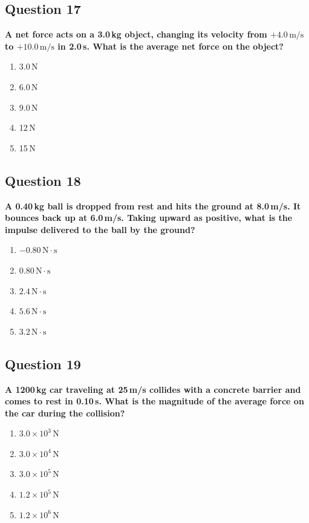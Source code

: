 \documentclass[12pt,letterpaper]{article}
\begin{document}
\subsection{Question 17}

\begin{questionbox}
\textbf{A net force acts on a 3.0\,kg object, changing its velocity from $+4.0\,\text{m/s}$ to $+10.0\,\text{m/s}$ in 2.0\,s. What is the average net force on the object?}

\begin{enumerate}[label=\alph*)]
    \item 3.0\,N
    \item 6.0\,N
    \item 9.0\,N
    \item 12\,N
    \item 15\,N
\end{enumerate}
\end{questionbox}

\subsection{Question 18}

\begin{questionbox}
\textbf{A 0.40\,kg ball is dropped from rest and hits the ground at 8.0\,m/s. It bounces back up at 6.0\,m/s. Taking upward as positive, what is the impulse delivered to the ball by the ground?}

\begin{enumerate}[label=\alph*)]
    \item $-0.80\,\text{N}\cdot\text{s}$
    \item $0.80\,\text{N}\cdot\text{s}$
    \item $2.4\,\text{N}\cdot\text{s}$
    \item $5.6\,\text{N}\cdot\text{s}$
    \item $3.2\,\text{N}\cdot\text{s}$
\end{enumerate}
\end{questionbox}

\subsection{Question 19}

\begin{questionbox}
\textbf{A 1200\,kg car traveling at 25\,m/s collides with a concrete barrier and comes to rest in 0.10\,s. What is the magnitude of the average force on the car during the collision?}

\begin{enumerate}[label=\alph*)]
    \item $3.0 \times 10^3\,\text{N}$
    \item $3.0 \times 10^4\,\text{N}$
    \item $3.0 \times 10^5\,\text{N}$
    \item $1.2 \times 10^5\,\text{N}$
    \item $1.2 \times 10^6\,\text{N}$
\end{enumerate}
\end{questionbox}
\end{document}

